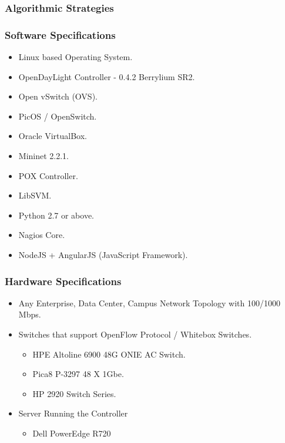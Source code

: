 \documentclass[10pt]{beamer}
\begin{document}
\begin{frame}
\frametitle{Algorithmic Strategies}
\end{frame}

	

\begin{frame}
\frametitle{Software Specifications}
\begin{itemize}
\footnotesize
\item
Linux based Operating System.
\item
OpenDayLight Controller - 0.4.2 Berrylium SR2.
\item
Open vSwitch (OVS).
\item
PicOS / OpenSwitch.
\item
Oracle VirtualBox.
\item
Mininet 2.2.1.
\item
POX Controller.
\item
LibSVM.
\item
Python 2.7 or above.
\item
Nagios Core.
\item
NodeJS + AngularJS (JavaScript Framework). 
\end{itemize}
\end{frame}

\begin{frame}
\frametitle{Hardware Specifications}
\begin{itemize}
\footnotesize
\item
Any Enterprise, Data Center, Campus Network Topology with 100/1000 Mbps.
\item
Switches that support OpenFlow Protocol / Whitebox Switches.
\begin{itemize}
\footnotesize
\item
HPE Altoline 6900 48G ONIE AC Switch.
\item
Pica8 P-3297 48 X 1Gbe.
\item
HP 2920 Switch Series.
\end{itemize}

\item
Server Running the Controller
\begin{itemize}
\footnotesize
\item
Dell PowerEdge R720
\end{itemize}

\end{itemize}
\end{frame}
\end{document}
